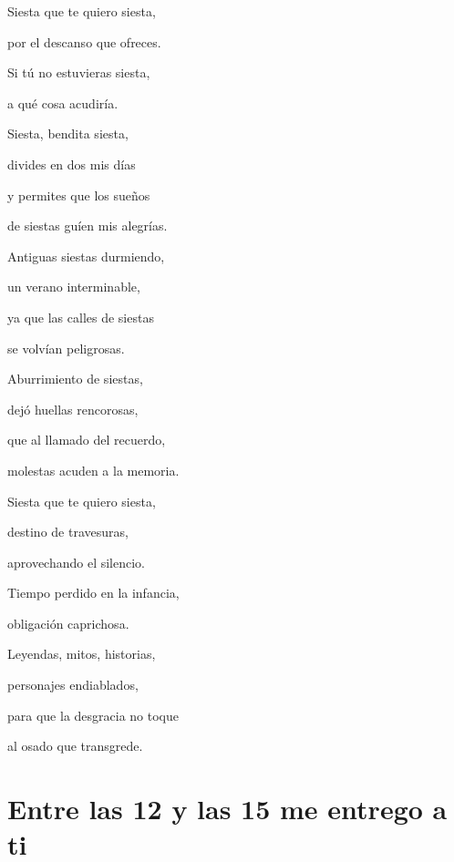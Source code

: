 \documentclass[11pt,twoside,openright,a5paper]{book}
\begin{document}
\begin{center}

Siesta que te quiero siesta,

por el descanso que ofreces.

Si tú no estuvieras siesta,

a qué cosa acudiría.

\vspace{0.5cm}

Siesta, bendita siesta,

divides en dos mis días

y permites que los sueños

de siestas guíen mis alegrías.

\vspace{0.5cm}

Antiguas siestas durmiendo,

un verano interminable,

ya que las calles de siestas

se volvían peligrosas.

\vspace{0.5cm}

Aburrimiento de siestas,

dejó huellas rencorosas,

que  al llamado del recuerdo,

molestas acuden a la memoria.

\vspace{0.5cm}

Siesta que te quiero siesta,

destino de travesuras,

aprovechando el silencio.

Tiempo perdido en la infancia,

obligación caprichosa.

\vspace{0.5cm}

Leyendas, mitos, historias,

personajes endiablados,

para que la desgracia no toque

al osado que transgrede.
\end{center}

\section*{Entre las 12 y las 15 me entrego a ti}
\end{document}
